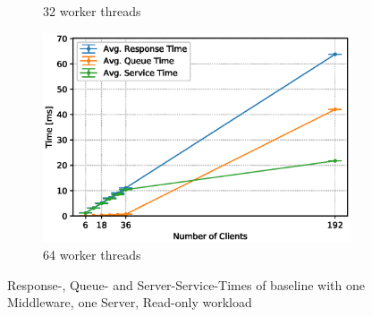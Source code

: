 \documentclass[11pt,a4paper]{article}
\begin{document}
\begin{figure}
\begin{subfigure}{.5\textwidth}
        \caption{32 worker threads}
    \end{subfigure}
    \begin{subfigure}{.5\textwidth}
        \includegraphics[width=1\linewidth]{plots/3_1a_extendedLatencyMiddleware_64w.eps}
        \caption{64 worker threads}
    \end{subfigure}

    \caption{Response-, Queue- and Server-Service-Times of baseline with one Middleware, one Server, Read-only workload}
    \label{fig:3-1-times-readonly}
\end{figure}
\end{document}

